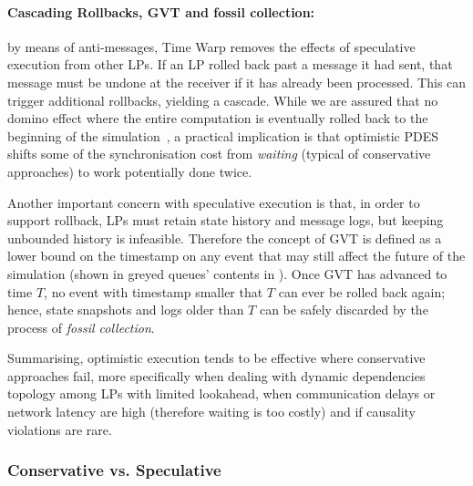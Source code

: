 \paragraph{Cascading Rollbacks, GVT and fossil collection:} by means of
anti-messages, Time Warp removes the effects of speculative execution from
other \ac{LP}s. If an \ac{LP} rolled back past a message it had sent, that
message must be undone at the receiver if it has already been processed. This
can trigger additional rollbacks, yielding a cascade. While we are assured that
no domino effect where the entire computation is eventually rolled back to the
beginning of the simulation~\cite{fujimoto1999Pads}, a practical implication is
that optimistic \ac{PDES} shifts some of the synchronisation cost from
\emph{waiting} (typical of conservative approaches) to work potentially done
twice.

Another important concern with speculative execution is that, in order to
support rollback, \ac{LP}s must retain state history and message logs, but
keeping unbounded history is infeasible. Therefore the concept of \ac{GVT} is
defined as a lower bound on the timestamp on any event that may still affect
the future of the simulation (shown in greyed queues' contents in
). Once \ac{GVT} has advanced to time $T$, no event
with timestamp smaller that $T$ can ever be rolled back again; hence, state
snapshots and logs older than $T$ can be safely discarded by the process of
\emph{fossil collection}.
\\
\newline

Summarising, optimistic execution tends to be effective where conservative
approaches fail, more specifically when dealing with dynamic dependencies
topology among \ac{LP}s with limited lookahead, when communication delays or
network latency are high (therefore waiting is too costly) and if causality
violations are rare.

\subsubsection{Conservative vs. Speculative}

